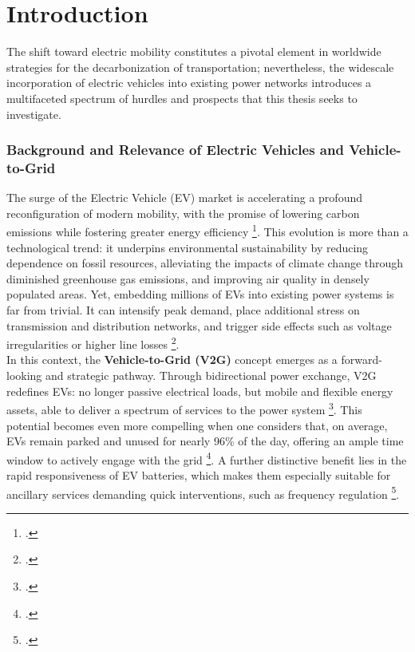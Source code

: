 \chapter{Introduction}
The shift toward electric mobility constitutes a pivotal element in worldwide strategies for the decarbonization of transportation; nevertheless, the widescale incorporation of electric vehicles into existing power networks introduces a multifaceted spectrum of hurdles and prospects that this thesis seeks to investigate.


\subsection{Background and Relevance of Electric Vehicles and Vehicle-to-Grid} %
The surge of the Electric Vehicle (EV) market is accelerating a profound reconfiguration of modern mobility, with the promise of lowering carbon emissions while fostering greater energy efficiency \footcite{orfanoudakis2022deep}. 
This evolution is more than a technological trend: it underpins environmental sustainability by reducing dependence on fossil resources, alleviating the impacts of climate change through diminished greenhouse gas emissions, and improving air quality in densely populated areas. 
Yet, embedding millions of EVs into existing power systems is far from trivial. 
It can intensify peak demand, place additional stress on transmission and distribution networks, and trigger side effects such as voltage irregularities or higher line losses \footcite{orfanoudakis2022deep, salvatti2020electric}.
\\
\noindent
In this context, the \textbf{Vehicle-to-Grid (V2G)} concept emerges as a forward-looking and strategic pathway. 
Through bidirectional power exchange, V2G redefines EVs: no longer passive electrical loads, but mobile and flexible energy assets, able to deliver a spectrum of services to the power system \footcite{alfaverh2022optima}. 
This potential becomes even more compelling when one considers that, on average, EVs remain parked and unused for nearly 96\% of the day, offering an ample time window to actively engage with the grid \footcite{evertsson2024investigating}. 
A further distinctive benefit lies in the rapid responsiveness of EV batteries, which makes them especially suitable for ancillary services demanding quick interventions, such as frequency regulation \footcite{alfaverh2022optima}. 
